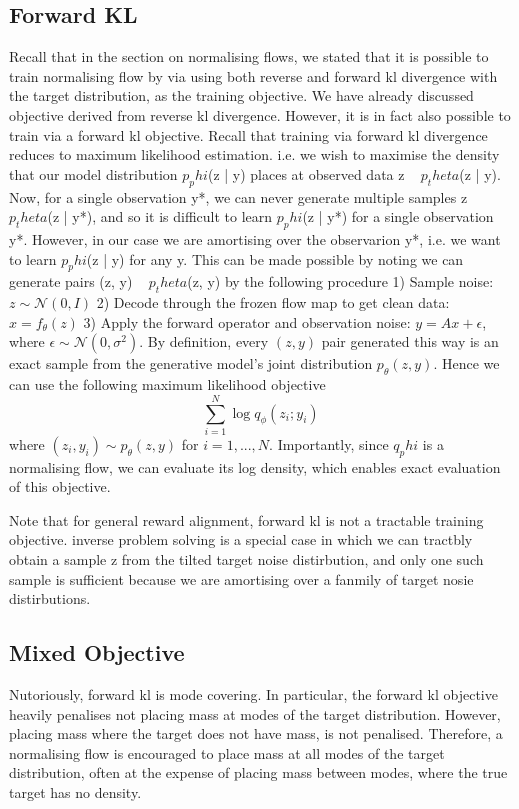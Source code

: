 \documentclass[12pt,a4paper]{report}
\begin{document}
\subsection{Forward KL}
Recall that in the section on normalising flows, we stated that it is possible to train normalising flow by via using both reverse and forward kl divergence with the target distribution, as the training objective. 
We have already discussed objective derived from reverse kl divergence. 
However, it is in fact also possible to train via a forward kl objective. 
Recall that training via forward kl divergence reduces to maximum likelihood estimation. 
i.e. we wish to maximise the density that our model distribution $p_phi$(z | y) places at observed data z ~ $p_theta$(z | y). 
Now, for a single observation y*, we can never generate multiple samples z ~ $p_theta$(z | y*), and so it is difficult to learn $p_phi$(z | y*) for a single observation y*. 
However, in our case we are amortising over the observarion y*, i.e. we want to learn $p_phi$(z | y) for any y. 
This can be made possible by noting we can generate pairs (z, y) ~ $p_theta$(z, y) by the following procedure 
1) Sample noise: $z \sim \mathcal{N}(0, I)$
2) Decode through the frozen flow map to get clean data: $x = f_\theta(z)$
3) Apply the forward operator and observation noise: $y = Ax + \epsilon$, where $\epsilon \sim \mathcal{N}(0, \sigma^2)$.
By definition, every $(z, y)$ pair generated this way is an exact sample from the generative model's joint distribution $p_\theta(z, y)$.
Hence we can use the following maximum likelihood objective 
$$ \sum_{i=1}^N \log q_\phi(z_i ; y_i) 
\label{eq:fKL_VFM_objective}
$$
where $(z_i, y_i) \sim p_\theta(z , y)$ for $i=1,...,N$.
Importantly, since $q_phi$ is a normalising flow, we can evaluate its log density, which enables exact evaluation of this objective. 

Note that for general reward alignment, forward kl is not a tractable training objective. 
inverse problem solving is a special case in which we can tractbly obtain a sample z from the tilted target noise distirbution, and only one such sample is sufficient because we are amortising over a fanmily of target nosie distirbutions. 

\subsection{Mixed Objective}
Nutoriously, forward kl is mode covering. In particular, the forward kl objective heavily penalises not placing mass at modes of the target distribution. 
However, placing mass where the target does not have mass, is not penalised. 
Therefore, a normalising flow is encouraged to place mass at all modes of the target distribution, often at the expense of placing mass between modes, where the true target has no density. 
\end{document}
